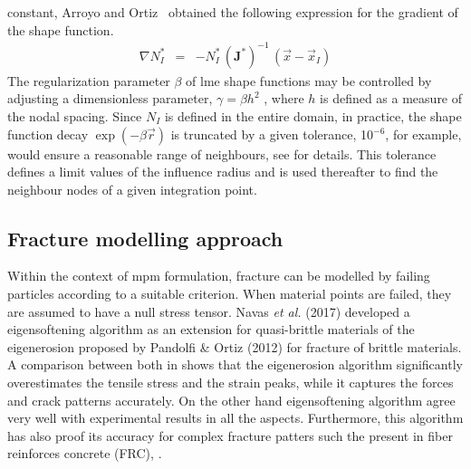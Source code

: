 \message{ !name(2020_EFM_MPM_Eigensoftening.tex)}\documentclass[preprint,12pt,a4paper]{elsarticle}
\newcommand{\tens}[1]{
  \ensuremath{\mathbf{{#1}}}
}
\begin{document}
constant, Arroyo and Ortiz~\cite{Arroyo2006} obtained the following
expression for the gradient of the shape function.
\begin{eqnarray}
  \label{eq:LME-gradp} 
\nabla N^*_I &=& -N^*_I \,  (\tens{J}^*)^{-1} \,  (\vec{x} - \vec{x}_I)
\end{eqnarray}
The regularization parameter $\beta$ of \acrshort{lme} shape functions may be
controlled by adjusting a dimensionless parameter, $\gamma=\beta h^2$
\cite{Arroyo2006}, where $h$ is defined as a measure of the nodal
spacing. Since $N_I$ is defined in the entire domain, in practice,
the shape function decay $\exp(-\beta \vec{r} )$ is truncated  by  a
given tolerance, 10$^{-6}$, for example, would ensure a reasonable
range of neighbours, see \cite{Arroyo2006} for details. This tolerance defines
a limit values of the influence radius and is used thereafter to
find the neighbour nodes of a given integration point.

\subsection{Fracture modelling approach}
\label{sec:2.3}
Within the context of \acrshort{mpm} formulation, fracture can be modelled by
failing particles according to a suitable criterion. When material
points are failed, they are assumed to have a null stress
tensor. Navas {\it et al.} (2017)\cite{Navas_2017_ES} developed a
eigensoftening algorithm as an extension for quasi-brittle materials
of the eigenerosion proposed by Pandolfi \& Ortiz
(2012)\cite{Pandolfi_2012} for fracture of brittle materials. A
comparison between both in \cite{Navas_2017_ES} shows that
the eigenerosion algorithm significantly overestimates the tensile
stress and the strain peaks, while it captures the forces and crack
patterns accurately. On the other hand eigensoftening algorithm agree
very well with experimental results in all the aspects. Furthermore,
this algorithm has also proof its accuracy for complex fracture
patters such the present in fiber reinforces concrete (FRC),
\cite{Navas_2018_ES}.\\
\end{document}

